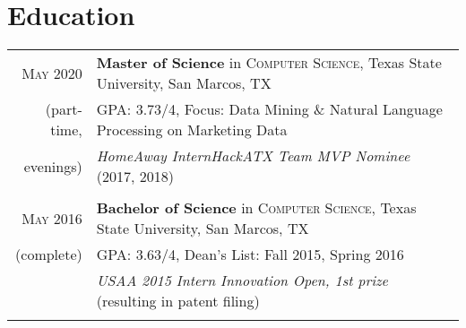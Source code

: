 \documentclass[a4paper,10pt]{article}
\begin{document}
\section{Education}
\begin{tabular}{rl}	
	\textsc{May} 2020 & \textbf{Master of Science} in \textsc{Computer Science}, Texas State University, San Marcos, TX\\
	
	(part-time, &\normalsize \textsc{GPA}: 3.73/4, Focus: Data Mining \& Natural Language Processing on Marketing Data \\ 
	
	evenings)& \emph{HomeAway InternHackATX Team MVP Nominee} (2017, 2018) \\
	
	& \\
	
	\textsc{May} 2016 & \textbf{Bachelor of Science} in \textsc{Computer Science}, Texas State University, San Marcos, TX \\
	
	(complete) &\normalsize \textsc{GPA}: 3.63/4,  Dean's List: Fall 2015, Spring 2016 \\
	
	& \emph{USAA 2015 Intern Innovation Open, 1st prize} (resulting in patent filing)  \\
	
	& \\
\end{tabular}
\end{document}
